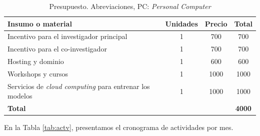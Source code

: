 \documentclass[a4paper]{article}
\begin{document}
\begin{table}[H]
	\centering
	\setlength{\tabcolsep}{0.5em} %
	{\renewcommand{\arraystretch}{1.2}%
		\caption{Presupuesto. Abreviaciones, PC: \textit{Personal Computer}}
		\label{tab:presupuesto}
		\begin{tabular}{|p{8cm}|c|c|c|} \hline
			\textbf{Insumo o material}    & \textbf{Unidades} & \textbf{Precio} & \textbf{Total} \\ \hline
			Incentivo para el investigador principal          & 1                 & 700            & 700           \\
			Incentivo para el co-investigador & 1                 & 700            & 700           \\
			Hosting y dominio                      & 1                 & 600            & 600           \\
			Workshops y cursos       & 1                 & 1000            & 1000           \\
			Servicios de \textit{cloud computing} para entrenar los modelos       & 1                 & 1000            & 1000           \\
			 \hline
			\textbf{Total}                         &                   &                 & \textbf{4000}         \\ \hline
		\end{tabular}
	}
\end{table}


En la Tabla \ref{tab:actv}, presentamos el cronograma de actividades por mes.
\end{document}
